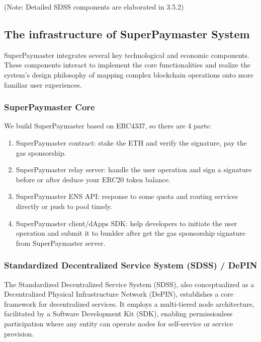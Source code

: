 \documentclass[preprint,12pt]{elsarticle}
\begin{document}
(Note: Detailed SDSS components are elaborated in 3.5.2)

\subsection{The infrastructure of SuperPaymaster System}
\label{subsec:key-components}

SuperPaymaster integrates several key technological and economic components. These components interact to implement the core functionalities and realize the system's design philosophy of mapping complex blockchain operations onto more familiar user experiences.

\subsubsection{SuperPaymaster Core}

We build SuperPaymaster based on ERC4337, so there are 4 parts:

\begin{enumerate}
\item SuperPaymaster contract: stake the ETH and verify the signature, pay the gas sponsorship.
\item SuperPaymaster relay server: handle the user operation and sign a signature before or after deduce your ERC20 token balance.
\item SuperPaymaster ENS API: response to some quota and routing services directly or push to pool timely.
\item SuperPaymaster client/dApps SDK: help developers to initiate the user operation and submit it to bunlder after get the gas sponsorship signature from SuperPaymaster server.
\end{enumerate}

\subsubsection{Standardized Decentralized Service System (SDSS) / DePIN}

The Standardized Decentralized Service System (SDSS), also conceptualized as a Decentralized Physical Infrastructure Network (DePIN), establishes a core framework for decentralized services. It employs a multi-tiered node architecture, facilitated by a Software Development Kit (SDK), enabling permissionless participation where any entity can operate nodes for self-service or service provision.
\end{document}
